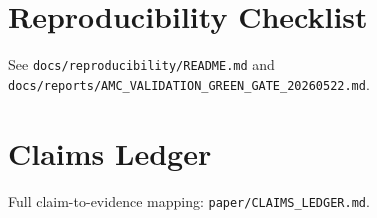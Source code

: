 \appendix
\section{Reproducibility Checklist}
\label{app:repro}

See \texttt{docs/reproducibility/README.md} and
\texttt{docs/reports/AMC\_VALIDATION\_GREEN\_GATE\_20260522.md}.

\section{Claims Ledger}
\label{app:claims}

Full claim-to-evidence mapping: \texttt{paper/CLAIMS\_LEDGER.md}.
